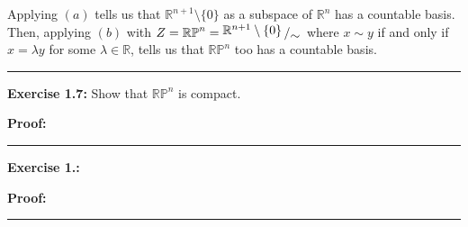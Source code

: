 \documentclass{article}
\newcommand{\bigslant}[2]{{\raisebox{.2em}{$#1$}\left/\raisebox{-.2em}{$#2$}\right.}}
\begin{document}
\vskip 0.5cm
Applying $(a)$ tells us that $\mathbb{R}^{n+1} \setminus \{0\}$ as a subspace of $\mathbb{R}^n$ has a countable basis. Then, applying $(b)$ with $Z = \mathbb{RP}^n = \bigslant{\mathbb{R}^{n+1} \setminus \{0\}}{\sim}$ where $x \sim y$ if and only if $x = \lambda y$ for some $\lambda \in \mathbb{R}$, tells us that $\mathbb{RP}^n$ too has a countable basis.
 
\vskip 0.5cm
\hrule
\vskip 0.5cm

\textbf{Exercise 1.7:} Show that $\mathbb{RP}^n$ is compact.  

\vskip 0.5cm

\textbf{Proof:}

\vskip 0.5cm
\hrule
\vskip 0.5cm

\textbf{Exercise 1.:} 

\vskip 0.5cm

\textbf{Proof:}

\vskip 0.5cm
\hrule
\vskip 0.5cm
\end{document}
